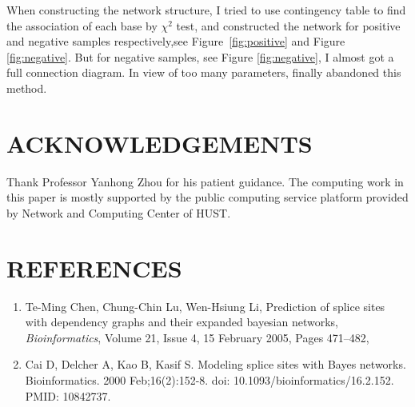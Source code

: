 \documentclass{gapd}
\begin{document}
When constructing the network structure, I tried to use contingency
table to find the association of each base by \(\chi^2\) test, and
constructed the network for positive and negative samples respectively,see Figure~\ref*{fig:positive} and Figure \ref*{fig:negative}.
But for negative samples, see Figure \ref*{fig:negative}, I almost got a full connection diagram. In
view of too many parameters, finally abandoned this method.

\section{ACKNOWLEDGEMENTS}\label{acknowledgements}

Thank Professor Yanhong Zhou for his patient guidance. The computing
work in this paper is mostly supported by the public computing service
platform provided by Network and Computing Center of HUST.

\section{REFERENCES}\label{references}

\begin{enumerate}
  \item
    Te-Ming Chen, Chung-Chin Lu, Wen-Hsiung Li, Prediction of splice sites
    with dependency graphs and their expanded bayesian networks,
    \emph{Bioinformatics}, Volume 21, Issue 4, 15 February 2005, Pages
    471--482, 
  \item
    Cai D, Delcher A, Kao B, Kasif S. Modeling splice sites with Bayes
    networks. Bioinformatics. 2000 Feb;16(2):152-8. doi:
    10.1093/bioinformatics/16.2.152. PMID: 10842737.
\end{enumerate}
\end{document}
